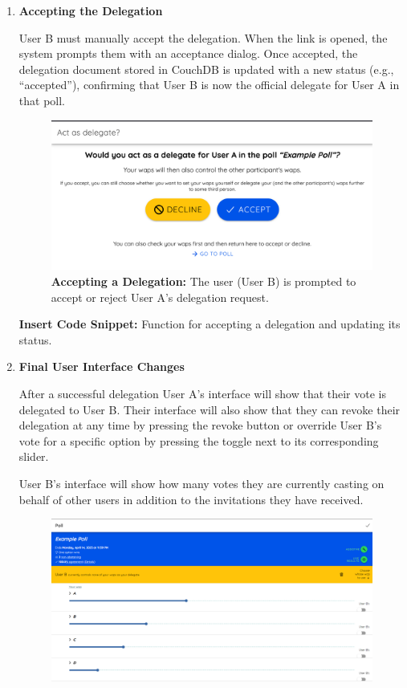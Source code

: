\begin{enumerate}
\item \textbf{Accepting the Delegation}

User B must manually accept the delegation. When the link is opened, the system prompts them with an acceptance dialog. Once accepted, the delegation document stored in CouchDB is updated with a new status (e.g., ``accepted''), confirming that User B is now the official delegate for User A in that poll.

\begin{figure}[H]
    \centering
    \includegraphics[width=0.8\linewidth]{../common/initial_vodle_screenshots/delaccept.png}
    \caption{\textbf{Accepting a Delegation:} The user (User B) is prompted to accept or reject User A's delegation request.}
    \label{fig:delaccept_initial}
\end{figure}

\textbf{Insert Code Snippet:} Function for accepting a delegation and updating its status.

\item \textbf{Final User Interface Changes}

After a successful delegation User A's interface will show that their vote is delegated to User B. Their interface will also show that they can revoke their delegation at any time by pressing the revoke button or override User B's vote for a specific option by pressing the toggle next to its corresponding slider.

User B's interface will show how many votes they are currently casting on behalf of other users in addition to the invitations they have received.
\begin{figure} [H]
    \centering
    \includegraphics[width=0.8\linewidth]{../common/initial_vodle_screenshots/userA_after.png}


\end{figure}
\end{enumerate}
